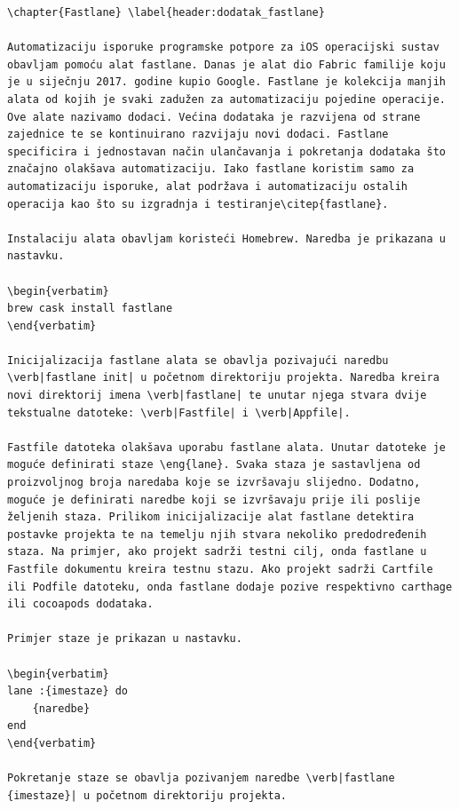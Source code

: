 \documentclass[times, utf8, diplomski, numeric]{fer}
\newcommand{\eng}[1]{(engl. \textit{#1})}
\begin{document}
\begin{appendices}
\begin{lstlisting}[caption=Provjera postojanja i pokretanje Swiftlint alata, label=listing:swiftlint]
\chapter{Fastlane} \label{header:dodatak_fastlane}

Automatizaciju isporuke programske potpore za iOS operacijski sustav obavljam pomoću alat fastlane. Danas je alat dio Fabric familije koju je u siječnju 2017. godine kupio Google. Fastlane je kolekcija manjih alata od kojih je svaki zadužen za automatizaciju pojedine operacije. Ove alate nazivamo dodaci. Većina dodataka je razvijena od strane zajednice te se kontinuirano razvijaju novi dodaci. Fastlane specificira i jednostavan način ulančavanja i pokretanja dodataka što značajno olakšava automatizaciju. Iako fastlane koristim samo za automatizaciju isporuke, alat podržava i automatizaciju ostalih operacija kao što su izgradnja i testiranje\citep{fastlane}.

Instalaciju alata obavljam koristeći Homebrew. Naredba je prikazana u nastavku.

\begin{verbatim}
brew cask install fastlane
\end{verbatim}

Inicijalizacija fastlane alata se obavlja pozivajući naredbu \verb|fastlane init| u početnom direktoriju projekta. Naredba kreira novi direktorij imena \verb|fastlane| te unutar njega stvara dvije tekstualne datoteke: \verb|Fastfile| i \verb|Appfile|.

Fastfile datoteka olakšava uporabu fastlane alata. Unutar datoteke je moguće definirati staze \eng{lane}. Svaka staza je sastavljena od proizvoljnog broja naredaba koje se izvršavaju slijedno. Dodatno, moguće je definirati naredbe koji se izvršavaju prije ili poslije željenih staza. Prilikom inicijalizacije alat fastlane detektira postavke projekta te na temelju njih stvara nekoliko predodređenih staza. Na primjer, ako projekt sadrži testni cilj, onda fastlane u Fastfile dokumentu kreira testnu stazu. Ako projekt sadrži Cartfile ili Podfile datoteku, onda fastlane dodaje pozive respektivno carthage ili cocoapods dodataka.

Primjer staze je prikazan u nastavku.

\begin{verbatim}
lane :{imestaze} do
    {naredbe}
end
\end{verbatim}

Pokretanje staze se obavlja pozivanjem naredbe \verb|fastlane {imestaze}| u početnom direktoriju projekta.


\end{lstlisting}
\end{appendices}
\end{document}
